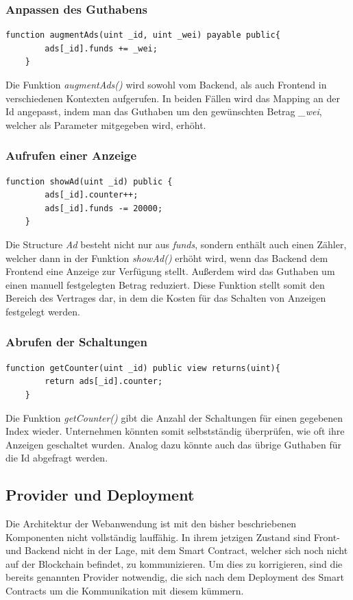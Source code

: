 \subsubsection{Anpassen des Guthabens}
\begin{lstlisting}[caption={Anpassen des Guthabens im Smart Contract},captionpos=b]
	function augmentAds(uint _id, uint _wei) payable public{
		ads[_id].funds += _wei;
	}
\end{lstlisting}
Die Funktion \emph{augmentAds()} wird sowohl vom Backend, als auch Frontend in verschiedenen Kontexten aufgerufen. In beiden Fällen wird das Mapping an der Id angepasst, indem man das Guthaben um den gewünschten Betrag \emph{\_wei}, welcher als Parameter mitgegeben wird, erhöht. 
\subsubsection{Aufrufen einer Anzeige}
\begin{lstlisting}[caption={Aufrufen einer Anzeige im Smart Contract},captionpos=b]
	function showAd(uint _id) public {
		ads[_id].counter++;
		ads[_id].funds -= 20000;
	}
\end{lstlisting}
Die Structure \emph{Ad} besteht nicht nur aus \emph{funds}, sondern enthält auch einen Zähler, welcher dann in der Funktion \emph{showAd()} erhöht wird, wenn das Backend dem Frontend eine Anzeige zur Verfügung stellt. Außerdem wird das Guthaben um einen manuell festgelegten Betrag reduziert. Diese Funktion stellt somit den Bereich des Vertrages dar, in dem die Kosten für das Schalten von Anzeigen festgelegt werden.
\subsubsection{Abrufen der Schaltungen}
\begin{lstlisting}[caption={Abrufen der Schaltungen im Smart Contract},captionpos=b]
	function getCounter(uint _id) public view returns(uint){
		return ads[_id].counter;
	}
\end{lstlisting}
Die Funktion \emph{getCounter()} gibt die Anzahl der Schaltungen für einen gegebenen Index wieder. Unternehmen könnten somit selbstständig überprüfen, wie oft ihre Anzeigen geschaltet wurden. Analog dazu könnte auch das übrige Guthaben für die Id abgefragt werden. 
\subsection{Provider und Deployment}
Die Architektur der Webanwendung ist mit den bisher beschriebenen Komponenten nicht vollständig lauffähig. In ihrem jetzigen Zustand sind Front- und Backend nicht in der Lage, mit dem Smart Contract, welcher sich noch nicht auf der Blockchain befindet, zu kommunizieren. Um dies zu korrigieren, sind die bereits genannten Provider notwendig, die sich nach dem Deployment des Smart Contracts um die Kommunikation mit diesem kümmern.
